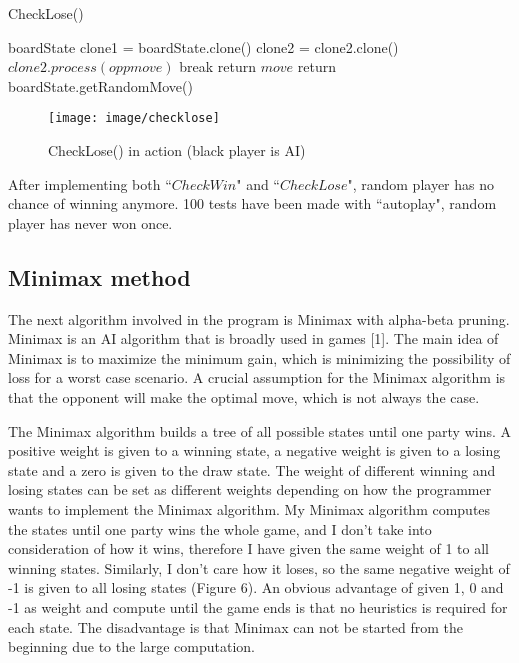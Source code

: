 \documentclass[a4paper,titlepage]{article}
\begin{document}
\begin{algorithm}[H]
    \begin{algorithmic}[1]
    \small
        \caption{CheckLose()} \label{algorithm: lose}
        \Require boardState
        \State clone1 = boardState.clone()
        \State clone2 = clone2.clone()
        \State $clone2.process(oppmove)$
        \State break
        \EndIf
        \EndFor
        \State return $move$
        \EndFor
        \State return boardState.getRandomMove()
        \end{algorithmic}
\end{algorithm}

\begin{figure}[!htb]
  \centering
  \texttt{[image: image/checklose]}
  \caption{CheckLose() in action (black player is AI)}
\end{figure}

After implementing both ``$CheckWin$" and ``$CheckLose$", random player has no chance of winning anymore. 100 tests have been made with ``autoplay", random player has never won once.\\

\subsection{\small{Minimax method}}
The next algorithm involved in the program is Minimax with alpha-beta pruning. Minimax is an AI algorithm that is broadly used in games [1]. The main idea of Minimax is to maximize the minimum gain, which is minimizing the possibility of loss for a worst case scenario. A crucial assumption for the Minimax algorithm is that the opponent will make the optimal move, which is not always the case.

The Minimax algorithm builds a tree of all possible states until one party wins. A positive weight is given to a winning state, a negative weight is given to a losing state and a zero is given to the draw state. The weight of different winning and losing states can be set as different weights depending on how the programmer wants to implement the Minimax algorithm. My Minimax algorithm computes the states until one party wins the whole game, and I don't take into consideration of how it wins, therefore I have given the same weight of 1 to all winning states. Similarly, I don't care how it loses, so the same negative weight of -1 is given to all losing states (Figure 6). An obvious advantage of given 1, 0 and -1 as weight and compute until the game ends is that no heuristics is required for each state. The disadvantage is that Minimax can not be started from the beginning due to the large computation. 
\end{document}
